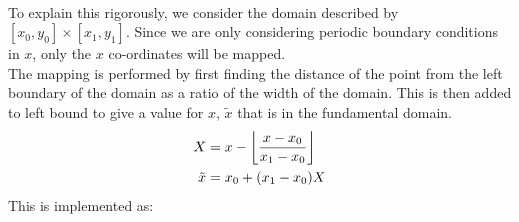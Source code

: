 \\
To explain this rigorously, we consider the domain described by $[x_0,y_0] \times [x_1,y_1]$. Since we are only considering periodic boundary conditions in $x$, only the $x$ co-ordinates will be mapped. 
\\
The mapping is performed by first finding the distance of the point from the left boundary of the domain as a ratio of the width of the domain. This is then added to left bound to give a value for $x$, $\tilde{x}$ that is in the fundamental domain. 
\begin{equation*}
	\begin{aligned}
		X &= x - \floor*{\frac{x - x_0}{x_1 - x_0}}\\
		\tilde{x} &= x_0 + (x_1 - x_0)X
	\end{aligned}
\end{equation*}
This is implemented as:

